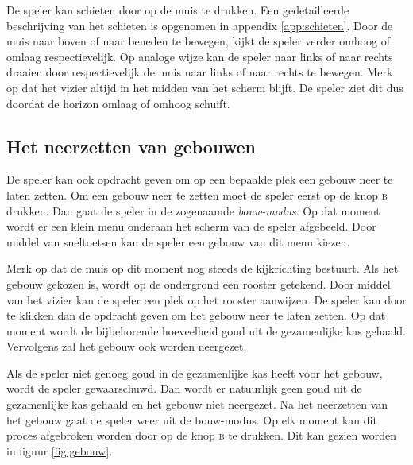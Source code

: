     De speler kan schieten door op de muis te drukken. Een gedetailleerde beschrijving van het schieten is opgenomen in appendix \ref{app:schieten}. Door de muis naar boven of naar beneden te bewegen, kijkt de speler verder omhoog of omlaag respectievelijk. Op analoge wijze kan de speler naar links of naar rechts draaien door respectievelijk de muis naar links of naar rechts te bewegen. Merk op dat het vizier altijd in het midden van het scherm blijft. De speler ziet dit dus doordat de horizon omlaag of omhoog schuift.

    \subsection{Het neerzetten van gebouwen}
    De speler kan ook opdracht geven om op een bepaalde plek een gebouw neer te laten zetten. Om een gebouw neer te zetten moet de speler eerst op de knop \textsc{b} drukken. Dan gaat de speler in de zogenaamde \emph{bouw-modus}. Op dat moment wordt er een klein menu onderaan het scherm van de speler afgebeeld. Door middel van sneltoetsen kan de speler een gebouw van dit menu kiezen.

    Merk op dat de muis op dit moment nog steeds de kijkrichting bestuurt. Als het gebouw gekozen is, wordt op de ondergrond een rooster getekend. Door middel van het vizier kan de speler een plek op het rooster aanwijzen. De speler kan door te klikken dan de opdracht geven om het gebouw neer te laten zetten. Op dat moment wordt de bijbehorende hoeveelheid goud uit de gezamenlijke kas gehaald. Vervolgens zal het gebouw ook worden neergezet.

    Als de speler niet genoeg goud in de gezamenlijke kas heeft voor het gebouw, wordt de speler gewaarschuwd. Dan wordt er natuurlijk geen goud uit de gezamenlijke kas gehaald en het gebouw niet neergezet. Na het neerzetten van het gebouw gaat de speler weer uit de bouw-modus. Op elk moment kan dit proces afgebroken worden door op de knop \textsc{b} te drukken. Dit kan gezien worden in figuur \ref{fig:gebouw}.


